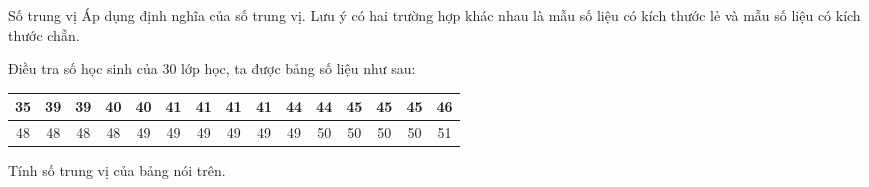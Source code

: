 \begin{dang}{Số trung vị}
Áp dụng định nghĩa của số trung vị. Lưu ý có hai trường hợp khác nhau là mẫu số liệu có kích thước lẻ và mẫu số liệu có kích thước chẵn. 
\end{dang}

\begin{vd}%
Điều tra  số học sinh của $30$ lớp học, ta được bảng số liệu như sau:
\begin{center}
\begin{tabular}{|c|c|c|c|c|c|c|c|c|c|c|c|c|c|c|}
\hline
  35& 39 &39&40& 40 &41 &41& 41&41 &44 &44 &45 &45 &45 &46  \\
\hline
 48 &48 &48&48& 49 &49 &49&49 &49 &49 &50 &50 &50 &50 &51  \\
\hline	
\end{tabular}
\end{center}
Tính số trung vị của bảng nói trên.
\end{vd}

